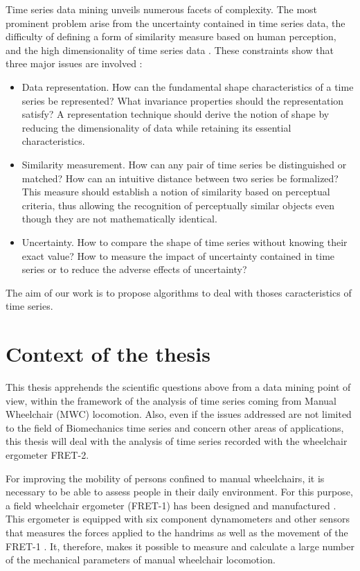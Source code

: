 Time series data mining unveils numerous facets of complexity. The most prominent
problem arise from the uncertainty contained in time series data,  the difficulty of
defining a form of similarity measure based on human perception, and the high dimensionality of time series data \cite{Esling2012}. These constraints show  that three major issues are involved :


\begin{itemize}
\item Data representation. How can the fundamental shape characteristics of a time series
be represented? What invariance properties should the representation satisfy? A
representation technique should derive the notion of shape by reducing the dimensionality
of data while retaining its essential characteristics.

\item Similarity measurement. How can any pair of time series be distinguished or
matched? How can an intuitive distance between two series be formalized? This
measure should establish a notion of similarity based on perceptual criteria, thus
allowing the recognition of perceptually similar objects even though they are not
mathematically identical.  

\item Uncertainty. How to compare the shape of time series without knowing their exact value? How to measure the impact of uncertainty contained in time series or to reduce the adverse effects of uncertainty? 
\end{itemize}

The aim of our work is to propose algorithms to deal with thoses caracteristics of time series.

\section*{Context of the thesis}
This thesis apprehends the scientific questions above from a data mining point of view, within the framework of the analysis of time series coming from Manual Wheelchair (MWC) locomotion. Also, even if the issues addressed are not limited to the field of Biomechanics time series and concern other areas of applications, this thesis will deal with the analysis of time series recorded with the wheelchair ergometer FRET-2.


For improving the mobility of persons confined to manual wheelchairs, it is necessary to be able to assess people in their daily environment. For this purpose, a field wheelchair ergometer  (FRET-1) has been designed and manufactured  \cite{dabonneville2005self}. This ergometer is equipped with  six component dynamometers and other sensors that measures the forces applied to the handrims as well as the movement of the FRET-1 \cite{couetard2000}. It, therefore, makes it possible to measure and calculate a large number of the mechanical parameters of manual wheelchair locomotion.


